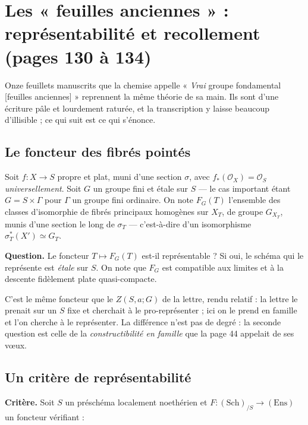 \documentclass[11pt,a4paper]{article}
\begin{document}
\section*{Les « feuilles anciennes » : représentabilité et recollement (pages 130 à 134)}

Onze feuillets manuscrits que la chemise appelle « \emph{Vrai} groupe
fondamental [feuilles anciennes] » reprennent la même théorie de sa main. Ils
sont d'une écriture pâle et lourdement raturée, et la transcription y laisse
beaucoup d'illisible ; ce qui suit est ce qui s'énonce.

\subsection*{Le foncteur des fibrés pointés}

Soit $f : X \to S$ propre et plat, muni d'une section $\sigma$, avec
$f_{*}(\mathcal{O}_{X}) = \mathcal{O}_{S}$ \emph{universellement}. Soit $G$ un
groupe fini et étale sur $S$ --- le cas important étant $G = S \times \Gamma$
pour $\Gamma$ un groupe fini ordinaire. On note $F_{G}(T)$ l'ensemble des classes d'isomorphie de fibrés principaux
homogènes sur $X_{T}$, de groupe $G_{X_{T}}$, munis d'une section le long de
$\sigma_{T}$ --- c'est-à-dire d'un isomorphisme
$\sigma_{T}^{*}(X') \simeq G_{T}$.

\textbf{Question.} Le foncteur $T \mapsto F_{G}(T)$ est-il représentable ? Si
oui, le schéma qui le représente est \emph{étale} sur $S$. On note que
$F_{G}$ est compatible aux limites et à la descente fidèlement plate
quasi-compacte.

C'est le même foncteur que le $Z(S,a;G)$ de la lettre, rendu relatif : la
lettre le prenait sur un $S$ fixe et cherchait à le pro-représenter ; ici on le
prend en famille et l'on cherche à le représenter. La différence n'est pas de
degré : la seconde question est celle de la \emph{constructibilité en famille}
que la page 44 appelait de ses vœux.

\subsection*{Un critère de représentabilité}

\textbf{Critère.} Soit $S$ un préschéma localement noethérien et
$F : (\mathrm{Sch})_{/S} \to (\mathrm{Ens})$ un foncteur vérifiant :
\end{document}
